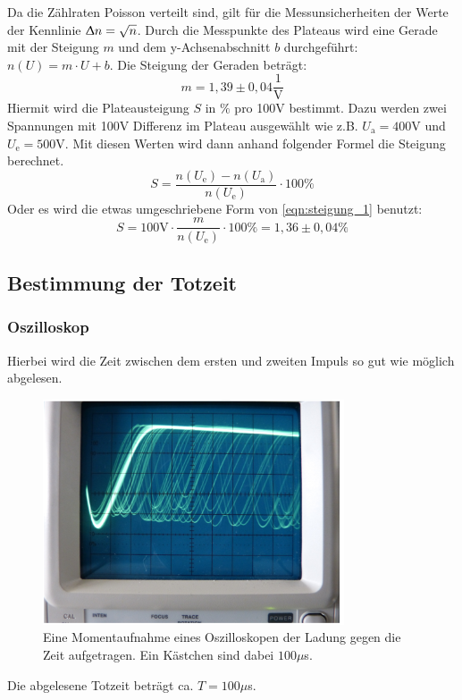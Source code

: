 \documentclass[titlepage = firstcover]{scrartcl}
\begin{document}
      Da die Zählraten Poisson verteilt sind, gilt für die Messunsicherheiten der Werte der Kennlinie $\Updelta n = \sqrt{n}$. Durch die Messpunkte des Plateaus wird eine Gerade mit der Steigung $m$ und dem y-Achsenabschnitt $b$ durchgeführt: $n(U) = m \cdot U + b$. Die Steigung der Geraden beträgt:
      \begin{equation}
        m = 1,39 \pm 0,04 \frac{1}{\text{V}}
      \end{equation}
      Hiermit wird die Plateausteigung $S$ in $\%$ pro 100V bestimmt. Dazu werden zwei Spannungen mit 100V Differenz im Plateau ausgewählt wie z.B. $U_\text{a} = 400$V und $U_\text{e} = 500$V. Mit diesen Werten wird dann anhand folgender Formel die Steigung berechnet.
      \begin{equation}
        S = \frac{n(U_\text{e}) - n(U_\text{a})}{n(U_\text{e})} \cdot 100 \%
        \label{eqn:steigung_1}
      \end{equation}
      Oder es wird die etwas umgeschriebene Form von \autoref{eqn:steigung_1} benutzt:
      \begin{equation}
          S = 100\text{V} \cdot \frac{m}{n(U_\text{e})} \cdot 100 \% = 1,36 \pm 0,04 \%
      \end{equation}

    \subsection{Bestimmung der Totzeit}
      \subsubsection{Oszilloskop}
        Hierbei wird die Zeit zwischen dem ersten und zweiten Impuls so gut wie möglich abgelesen.
        \begin{figure}[h]
          \centering
          \includegraphics[width = 0.7\linewidth]{Oszilloskop_Geiger_Mueller.png}
          \caption{Eine Momentaufnahme eines Oszilloskopen der Ladung gegen die Zeit aufgetragen. Ein Kästchen sind dabei $100 \mu$s.}
          \label{fig:totzeit_erholungszeit}
        \end{figure}
        \FloatBarrier
        Die abgelesene Totzeit beträgt ca. $T = 100 \mu$s.
\end{document}
